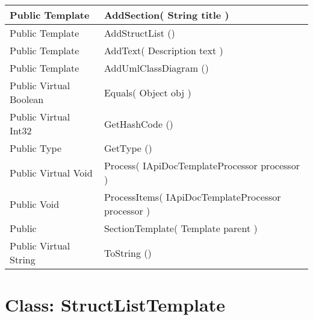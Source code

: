 \documentclass[11pt, oneside, a4paper]{book}
\begin{document}
\begin{center}
\begin{tabular}{| p{3cm} | p{12cm} | }
\hline
 Public  Template &  AddSection(\hypertarget{SoftwareEngineeringTools.{}Documentation.{}SectionTemplate.{}AddSection\_String}{} String  title  )\\
\hline
 Public  Template &  AddStructList ()\hypertarget{SoftwareEngineeringTools.{}Documentation.{}SectionTemplate.{}AddStructList}{}\\
\hline
 Public  Template &  AddText(\hypertarget{SoftwareEngineeringTools.{}Documentation.{}SectionTemplate.{}AddText\_Description}{} Description  text  )\\
\hline
 Public  Template &  AddUmlClassDiagram ()\hypertarget{SoftwareEngineeringTools.{}Documentation.{}SectionTemplate.{}AddUmlClassDiagram}{}\\
\hline
 Public  Virtual  Boolean &  Equals(\hypertarget{SoftwareEngineeringTools.{}Documentation.{}SectionTemplate.{}Equals\_Object}{} Object  obj  )\\
\hline
 Public  Virtual  Int32 &  GetHashCode ()\hypertarget{SoftwareEngineeringTools.{}Documentation.{}SectionTemplate.{}GetHashCode}{}\\
\hline
 Public  Type &  GetType ()\hypertarget{SoftwareEngineeringTools.{}Documentation.{}SectionTemplate.{}GetType}{}\\
\hline
 Public  Virtual  Void &  Process(\hypertarget{SoftwareEngineeringTools.{}Documentation.{}SectionTemplate.{}Process\_IApiDocTemplateProcessor}{} IApiDocTemplateProcessor  processor  )\\
\hline
 Public  Void &  ProcessItems(\hypertarget{SoftwareEngineeringTools.{}Documentation.{}SectionTemplate.{}ProcessItems\_IApiDocTemplateProcessor}{} IApiDocTemplateProcessor  processor  )\\
\hline
 Public  &  SectionTemplate(\hypertarget{SoftwareEngineeringTools.{}Documentation.{}SectionTemplate.{}SectionTemplate\_Template}{} Template  parent  )\\
\hline
 Public  Virtual  String &  ToString ()\hypertarget{SoftwareEngineeringTools.{}Documentation.{}SectionTemplate.{}ToString}{}\\
\hline
\end{tabular}
\end{center}
 


\hypertarget{SoftwareEngineeringTools.{}Documentation.{}StructListTemplate}{}
\section{Class: StructListTemplate}
\end{document}
